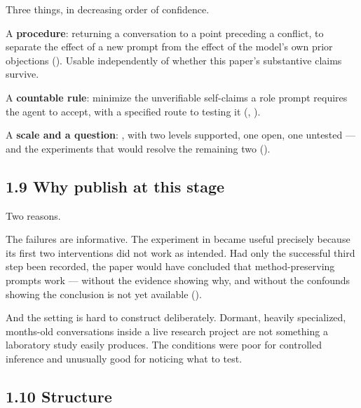 Three things, in decreasing order of confidence.

A \textbf{procedure}: returning a conversation to a point preceding a conflict, to separate the effect of a new prompt from the effect of the model's own prior objections (). Usable independently of whether this paper's substantive claims survive.

A \textbf{countable rule}: minimize the unverifiable self-claims a role prompt requires the agent to accept, with a specified route to testing it (, ).

A \textbf{scale and a question}: , with two levels supported, one open, one untested — and the experiments that would resolve the remaining two ().


\subsection*{1.9 Why publish at this stage}
\label{sec:en:1.9}

Two reasons.

The failures are informative. The experiment in  became useful precisely because its first two interventions did not work as intended. Had only the successful third step been recorded, the paper would have concluded that method-preserving prompts work — without the evidence showing why, and without the confounds showing the conclusion is not yet available ().

And the setting is hard to construct deliberately. Dormant, heavily specialized, months-old conversations inside a live research project are not something a laboratory study easily produces. The conditions were poor for controlled inference and unusually good for noticing what to test.


\subsection*{1.10 Structure}
\label{sec:en:1.10}

